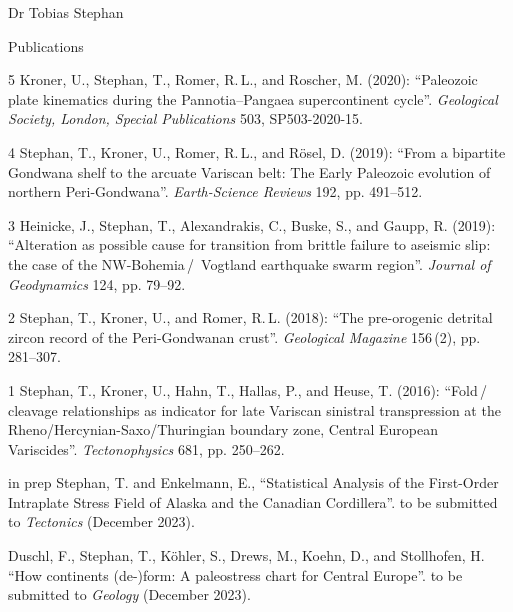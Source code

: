 \documentclass[10pt, paper=letter]{scrartcl} %
\begin{document}
\begin{cv}{Dr Tobias Stephan}
\begin{cvlist}{Publications}
    \item[5] Kroner, U., Stephan, T., Romer, R.\,L., and Roscher, M. (2020): \enquote{Paleozoic plate kinematics during the Pannotia--Pangaea supercontinent cycle}. \textit{Geological Society, London, Special Publications} 503, SP503-2020-15. 
%
    \item[4] Stephan, T., Kroner, U., Romer, R.\,L., and R\"osel, D. (2019): \enquote{From a bipartite Gondwana shelf to the arcuate Variscan belt: The Early Paleozoic evolution of northern Peri-Gondwana}. \textit{Earth-Science Reviews} 192, pp. 491--512.  
    \item[3] Heinicke, J., Stephan, T., Alexandrakis, C., Buske, S., and Gaupp, R. (2019): \enquote{Alteration as possible cause for transition from brittle failure to aseismic slip: the case of the NW-Bohemia\,/\, Vogtland earthquake swarm region}. \textit{Journal of Geodynamics} 124, pp. 79--92. 
    \item[2] Stephan, T., Kroner, U., and Romer, R.\,L. (2018): \enquote{The pre-orogenic detrital zircon record of the Peri-Gondwanan crust}. \textit{Geological Magazine} 156\,(2), pp. 281--307.\newline
    \item[1] Stephan, T., Kroner, U., Hahn, T., Hallas, P., and Heuse, T. (2016): \enquote{Fold\,/\,cleavage relationships as indicator for late Variscan sinistral transpression at the Rheno\-/Hercynian\--Saxo\-/Thuringian boundary zone, Central European Variscides}. \textit{Tectonophysics} 681, pp. 250--262. 

     \item[in prep] Stephan, T. and Enkelmann, E., \enquote{Statistical Analysis of the First-Order Intraplate Stress Field of Alaska and the Canadian Cordillera}. to be submitted to \textit{Tectonics} (December 2023).
     \item Duschl, F., Stephan, T., K\"ohler, S., Drews, M., Koehn, D., and Stollhofen, H. \enquote{How continents (de-)form: A paleostress chart for Central Europe}. to be submitted to \textit{Geology} (December 2023).   
    

\end{cvlist}
\end{cv}
\end{document}
